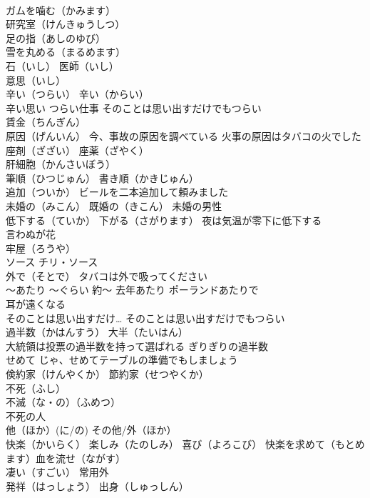 \documentclass[8pt]{extreport}
\begin{document}
\begin{CJK}{UTF8}{min}
\\	ガムを噛む（かみます）
\\	研究室（けんきゅうしつ）
\\	足の指（あしのゆび）
\\	雪を丸める（まるめます）
\\	石（いし） 医師（いし）
\\	意思（いし）
\\	辛い（つらい） 辛い（からい）
\\	辛い思い つらい仕事 そのことは思い出すだけでもつらい
\\	賃金（ちんぎん）
\\	原因（げんいん） 今、事故の原因を調べている 火事の原因はタバコの火でした
\\	座剤（ざざい） 座薬（ざやく）
\\	肝細胞（かんさいぼう）
\\	筆順（ひつじゅん） 書き順（かきじゅん）
\\	追加（ついか） ビールを二本追加して頼みました
\\	未婚の（みこん） 既婚の（きこん） 未婚の男性
\\	低下する（ていか） 下がる（さがります） 夜は気温が零下に低下する
\\	言わぬが花
\\	牢屋（ろうや）
\\	ソース チリ・ソース
\\	外で（そとで） タバコは外で吸ってください
\\	～あたり ～ぐらい 約～ 去年あたり ポーランドあたりで
\\	耳が遠くなる
\\	そのことは思い出すだけ… そのことは思い出すだけでもつらい
\\	過半数（かはんすう） 大半（たいはん）
\\	大統領は投票の過半数を持って選ばれる ぎりぎりの過半数
\\	せめて じゃ、せめてテーブルの準備でもしましょう
\\	倹約家（けんやくか） 節約家（せつやくか）
\\	不死（ふし） 
\\	不滅（な・の）（ふめつ）
\\	不死の人
\\	他（ほか）(に/の) その他/外（ほか）
\\	快楽（かいらく） 楽しみ（たのしみ） 喜び（よろこび） 快楽を求めて（もとめます）血を流せ（ながす）
\\	凄い（すごい） 常用外
\\	発祥（はっしょう） 出身（しゅっしん）

\end{CJK}
\end{document}
